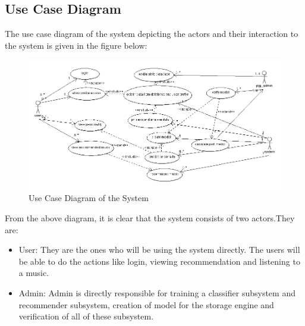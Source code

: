 \newpage
\subsection{Use Case Diagram}
The use case diagram of the system depicting the actors and their interaction to the system is given in the figure below:
\begin{figure}[!ht]
\centering
\includegraphics[width = 16 cm]{fig/Use.png}
\caption{Use Case Diagram of the System}
\label{fig:usecase}
\end{figure}

From the above diagram, it is clear that the system consists of two actors.They are:
\begin{itemize}
\item User: They are the ones who will be using the system directly. The users will be able to do the actions like login, viewing recommendation and listening to a music. 
\item Admin: Admin is directly responsible for training a classifier subsystem and recommender subsystem, creation of model for the storage engine and verification of all of these subsystem.
\end{itemize}

\newpage
